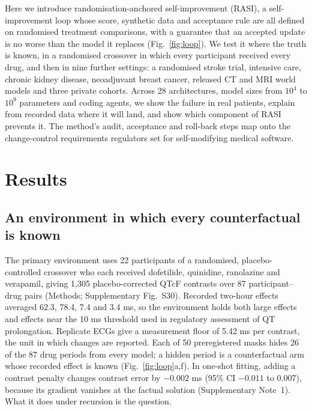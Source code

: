 \documentclass[11pt,a4paper]{article}
\begin{document}
Here we introduce randomisation-anchored self-improvement (RASI), a self-improvement loop whose score, synthetic data and acceptance rule are all defined on randomised treatment comparisons, with a guarantee that an accepted update is no worse than the model it replaces (Fig.~\ref{fig:loop}). We test it where the truth is known, in a randomised crossover in which every participant received every drug\cite{ecgrdvq,johannesen2014multichannel}, and then in nine further settings: a randomised stroke trial, intensive care, chronic kidney disease, neoadjuvant breast cancer, released CT and MRI world models and three private cohorts. Across 28 architectures, model sizes from $10^4$ to $10^9$ parameters and coding agents, we show the failure in real patients, explain from recorded data where it will land, and show which component of RASI prevents it. The method's audit, acceptance and roll-back steps map onto the change-control requirements regulators set for self-modifying medical software\cite{fdaPCCP2024,pccpPrinciples2023}.

\section{Results}
\subsection{An environment in which every counterfactual is known}
The primary environment uses 22 participants of a randomised, placebo-controlled crossover who each received dofetilide, quinidine, ranolazine and verapamil, giving 1,305 placebo-corrected QTcF contrasts over 87 participant--drug pairs (Methods; Supplementary Fig.~S30). Recorded two-hour effects averaged 62.3, 78.4, 7.4 and 3.4 ms, so the environment holds both large effects and effects near the 10 ms threshold used in regulatory assessment of QT prolongation\cite{ichE14}. Replicate ECGs give a measurement floor of 5.42 ms per contrast, the unit in which changes are reported. Each of 50 preregistered masks hides 26 of the 87 drug periods from every model; a hidden period is a counterfactual arm whose recorded effect is known (Fig.~\ref{fig:loop}a,f). In one-shot fitting, adding a contrast penalty changes contrast error by $-0.002$ ms (95\% CI $-0.011$ to 0.007), because its gradient vanishes at the factual solution (Supplementary Note~1). What it does under recursion is the question.
\end{document}

